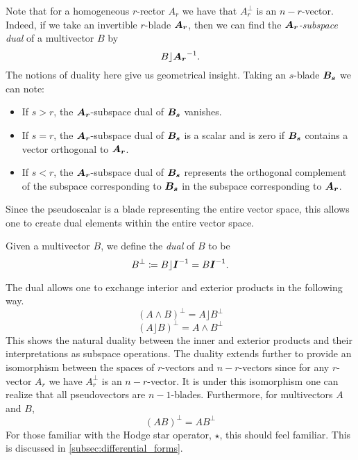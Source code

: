 Note that for a homogeneous $r$-rector $A_r$ we have that $A_r^\perp$ is an $n-r$-vector. Indeed, if we take an invertible $r$-blade $\boldsymbol{A_r}$, then we can find the \emph{$\boldsymbol{A_r}$-subspace dual} of a multivector $B$ by
\[
B \rfloor \boldsymbol{A_r}^{-1}.
\]
The notions of duality here give us geometrical insight. Taking an $s$-blade $\boldsymbol{B_s}$ we can note:
\begin{itemize}
    \item If $s>r$, the $\boldsymbol{A_r}$-subspace dual of $\boldsymbol{B_s}$ vanishes.
    \item If $s=r$, the $\boldsymbol{A_r}$-subspace dual of $\boldsymbol{B_s}$ is a scalar and is zero if $\boldsymbol{B_s}$ contains a vector orthogonal to $\boldsymbol{A_r}$.
    \item If $s<r$, the $\boldsymbol{A_r}$-subspace dual of $\boldsymbol{B_s}$ represents the orthogonal complement of the subspace corresponding to $\boldsymbol{B_s}$ in the subspace corresponding to $\boldsymbol{A_r}$.
\end{itemize}  
Since the pseudoscalar is a blade representing the entire vector space, this allows one to create dual elements within the entire vector space. 
\begin{definition}
Given a multivector $B$, we define the \emph{dual} of $B$ to be
\begin{equation}
B^\perp \coloneqq B \rfloor \boldsymbol{I}^{-1} = B\boldsymbol{I}^{-1}.
\end{equation}
\end{definition}
The dual allows one to exchange interior and exterior products in the following way.
\begin{equation}
\label{eq:wedge_to_dot}
 (A \wedge B)^\perp  = A\rfloor B^\perp
\end{equation}
\begin{equation}
\label{eq:dot_to_wedge}
    (A\rfloor B)^\perp = A \wedge B^\perp
\end{equation}
This shows the natural duality between the inner and exterior products and their interpretations as subspace operations. The duality extends further to provide an isomorphism between the spaces of $r$-vectors and $n-r$-vectors since for any $r$-vector $A_r$ we have $A_r^\perp$ is an $n-r$-vector. It is under this isomorphism one can realize that all pseudovectors are $n-1$-blades. Furthermore, for multivectors $A$ and $B$,
\begin{equation}
(AB)^\perp = AB^\perp
\end{equation}
For those familiar with the Hodge star operator, $\star$, this should feel familiar. This is discussed in \cref{subsec:differential_forms}.

